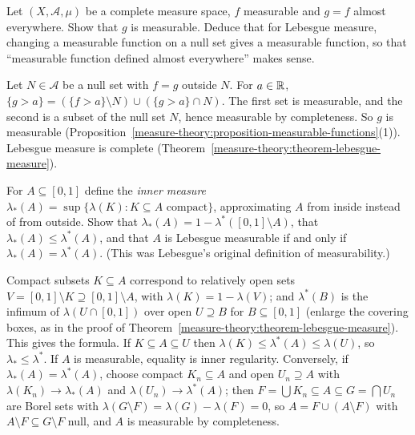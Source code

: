 \begin{exercise}\label{measure-theory:exercise-ae-measurable}
Let $(X, \mathcal{A}, \mu)$ be a complete measure space, $f$ measurable and $g = f$ almost everywhere. Show that $g$ is measurable. Deduce that for Lebesgue measure, changing a measurable function on a null set
gives a measurable function, so that ``measurable function defined almost everywhere'' makes sense.
\end{exercise}

\begin{solution}
Let $N \in \mathcal{A}$ be a null set with $f = g$ outside $N$. For $a \in \mathbb{R}$, $\{g > a\} = (\{f > a\} \setminus N) \cup (\{g > a\} \cap N)$. The first set is measurable, and the second is a subset of
the null set $N$, hence measurable by completeness. So $g$ is measurable (Proposition~\ref{measure-theory:proposition-measurable-functions}(1)). Lebesgue measure is complete
(Theorem~\ref{measure-theory:theorem-lebesgue-measure}).
\end{solution}

\begin{exercise}\label{measure-theory:exercise-inner-measure}
For $A \subseteq [0, 1]$ define the \emph{inner measure} $\lambda_*(A) = \sup\{\lambda(K) : K \subseteq A \text{ compact}\}$, approximating $A$ from inside instead of from outside. Show that
$\lambda_*(A) = 1 - \lambda^*([0, 1] \setminus A)$, that $\lambda_*(A) \leq \lambda^*(A)$, and that $A$ is Lebesgue measurable if and only if $\lambda_*(A) = \lambda^*(A)$. (This was Lebesgue's original
definition of measurability.)
\end{exercise}

\begin{solution}
Compact subsets $K \subseteq A$ correspond to relatively open sets $V = [0, 1] \setminus K \supseteq [0, 1] \setminus A$, with $\lambda(K) = 1 - \lambda(V)$; and $\lambda^*(B)$ is the infimum of $\lambda(U \cap [0, 1])$
over open $U \supseteq B$ for $B \subseteq [0, 1]$ (enlarge the covering boxes, as in the proof of Theorem~\ref{measure-theory:theorem-lebesgue-measure}). This gives the formula. If $K \subseteq A \subseteq U$
then $\lambda(K) \leq \lambda^*(A) \leq \lambda(U)$, so $\lambda_* \leq \lambda^*$. If $A$ is measurable, equality is inner regularity. Conversely, if $\lambda_*(A) = \lambda^*(A)$, choose compact $K_n \subseteq A$
and open $U_n \supseteq A$ with $\lambda(K_n) \to \lambda_*(A)$ and $\lambda(U_n) \to \lambda^*(A)$; then $F = \bigcup K_n \subseteq A \subseteq G = \bigcap U_n$ are Borel sets with
$\lambda(G \setminus F) = \lambda(G) - \lambda(F) = 0$, so $A = F \cup (A \setminus F)$ with $A \setminus F \subseteq G \setminus F$ null, and $A$ is measurable by completeness.
\end{solution}

